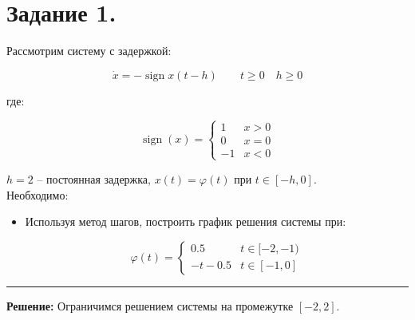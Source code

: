 \documentclass[a4paper,12pt]{article}
\begin{document}
	\newpage
	\tableofcontents
	
	\newpage
	\section{Задание 1.}
	
	Рассмотрим систему с задержкой:
	
	\[\dot{x} = - \operatorname{sign}x(t - h) \qquad t \ge 0 \quad h \ge 0\]
	
	где:
	
	\[
	\operatorname{sign}(x) =
	\begin{cases}
		1 & x > 0 \\
		0 & x = 0 \\
		-1 & x < 0
	\end{cases}
	\]
	
	\(h = 2\) -- постоянная задержка, \(x(t) = \varphi(t)\) при \(t \in [-h, 0]\).\\
	
	Необходимо:
	\begin{itemize}
		\item Используя метод шагов, построить график решения системы при:
		
		\[
		\varphi(t) =
		\begin{cases}
			0.5 & t \in [-2, -1) \\
			-t - 0.5 & t \in [-1, 0] 
		\end{cases}
		\]
		
	\end{itemize}
	
	\hrule
	\[\]	
	\textbf{Решение: } Ограничимся решением системы на промежутке \([-2,2]\).
	
\end{document}
